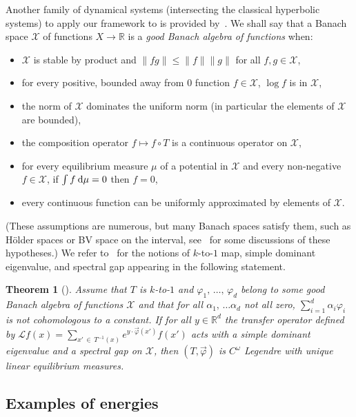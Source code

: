 \documentclass[10pt]{amsart}
\newtheorem{theo}{Theorem}[section]
\theoremstyle{definition}\newtheorem{defi}[theo]{Definition}\newtheorem{rema}[theo]{Remark}\newtheorem{exam}[theo]{Example}\newtheorem{exem}[theo]{Example}\newtheorem{nota}[theo]{Notation}
\theoremstyle{plain}
\theoremstyle{plain}
\newcommand\vpot{\vec\pot}
\newcommand*{\dd} {\relax\ifnum\lastnodetype>0\mskip\medmuskip\fi\mathrm{d}}
\newcommand{\pot}{\varphi}
\newcommand*\8{\infty}
\newcommand\RR{\mathbb{R}}
\newcommand{\CL}{\mathcal{L}}
\newcommand{\scX}{\mathscr{X}}
\begin{document}
Another family of dynamical systems (intersecting the classical hyperbolic systems) to apply our framework to is provided by~\cite[Corollary~B, Theorems~F \& G]{GKLM}. We shall say that a Banach space $\scX$ of functions $X\to \RR$ is a \emph{good Banach algebra of functions} when:
\begin{itemize}
\item $\scX$ is stable by product and $\lVert fg\rVert \le \lVert f\rVert \lVert g\rVert$ for all $f,g\in\scX$,
\item for every positive, bounded away from $0$ function $f\in\scX$, $\log f$ is in $\scX$,
\item the norm of $\scX$ dominates the uniform norm (in particular the elements of $\scX$ are bounded),
\item the composition operator $f\mapsto f\circ T$ is a continuous operator on $\scX$,
\item for every equilibrium measure $\mu$ of a potential in $\scX$ and every non-negative $f\in\scX$, if $\int f\dd\mu = 0$ then $f=0$,
\item every continuous function can be uniformly approximated by elements of $\scX$.
\end{itemize}
(These assumptions are numerous, but many Banach spaces satisfy them, such as H\"older spaces or BV space on the interval, see~\cite{GKLM} for some discussions of these hypotheses.) We refer to~\cite{GKLM} for the notions of $k$-to-$1$ map, simple dominant eigenvalue, and spectral gap appearing in the following statement.

\begin{theo}[\cite{GKLM}]\label{thm-classical-are-Legendre}
Assume that $T$ is $k$-to-$1$ and $\pot_1,\,\dots,\, \pot_d$ belong to some good Banach algebra of functions $\scX$ and that for all $\alpha_1,\,\dots\alpha_d$ not all zero, $\sum_{i=1}^d \alpha_i\pot_i$ is not cohomologous to a constant. If for all $ y\in\RR^d$ the transfer operator defined by $\CL f (x) = \sum_{x'\,\in\,T^{-1}(x)} e^{ y\cdot\vpot(x')} f(x')$ acts with a simple dominant eigenvalue and a spectral gap on $\scX$, then $(T,\vpot)$ is $C^\omega$ Legendre with unique linear equilibrium measures.
\end{theo}



\subsection{Examples of energies}\label{subsec-examples}
\end{document}
